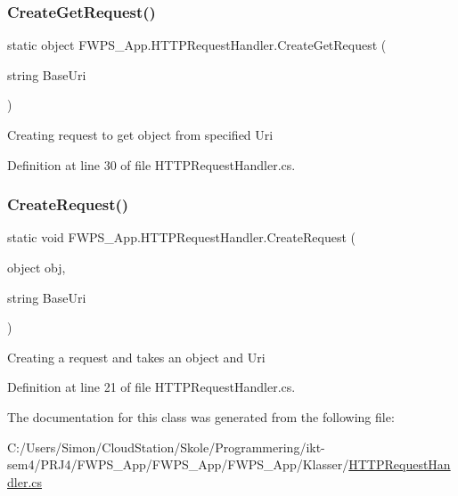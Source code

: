 \subsubsection{\texorpdfstring{Create\+Get\+Request()}{CreateGetRequest()}}
{\footnotesize\ttfamily static object F\+W\+P\+S\+\_\+\+App.\+H\+T\+T\+P\+Request\+Handler.\+Create\+Get\+Request (\begin{DoxyParamCaption}\item[{string}]{Base\+Uri }\end{DoxyParamCaption})\hspace{0.3cm}{\ttfamily [static]}}

Creating request to get object from specified Uri 

Definition at line 30 of file H\+T\+T\+P\+Request\+Handler.\+cs.

\mbox{\label{class_f_w_p_s___app_1_1_h_t_t_p_request_handler_a5a68754334dc0ad8df5e6febcadbd558}} 
\subsubsection{\texorpdfstring{Create\+Request()}{CreateRequest()}}
{\footnotesize\ttfamily static void F\+W\+P\+S\+\_\+\+App.\+H\+T\+T\+P\+Request\+Handler.\+Create\+Request (\begin{DoxyParamCaption}\item[{object}]{obj,  }\item[{string}]{Base\+Uri }\end{DoxyParamCaption})\hspace{0.3cm}{\ttfamily [static]}}

Creating a request and takes an object and Uri 

Definition at line 21 of file H\+T\+T\+P\+Request\+Handler.\+cs.



The documentation for this class was generated from the following file\+:\begin{DoxyCompactItemize}
\item 
C\+:/\+Users/\+Simon/\+Cloud\+Station/\+Skole/\+Programmering/ikt-\/sem4/\+P\+R\+J4/\+F\+W\+P\+S\+\_\+\+App/\+F\+W\+P\+S\+\_\+\+App/\+F\+W\+P\+S\+\_\+\+App/\+Klasser/\mbox{\hyperlink{_h_t_t_p_request_handler_8cs}{H\+T\+T\+P\+Request\+Handler.\+cs}}\end{DoxyCompactItemize}
